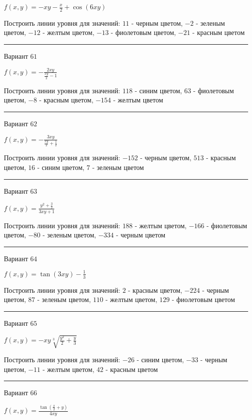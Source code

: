 \documentclass[11pt]{report}
\begin{document}
$f(x, y) = - x y - \frac{x}{2} + \cos{\left(6 x y \right)}$

Построить линии уровня для значений: $11$ - черным цветом, $-2$ - зеленым цветом, $-12$ - желтым цветом, $-13$ - фиолетовым цветом, $-21$ - красным цветом
\begin{center}
\noindent\rule{8cm}{0.4pt}
\end{center}
Вариант $61$


$f(x, y) = - \frac{2 x y}{\frac{x y}{2} - 1}$

Построить линии уровня для значений: $118$ - синим цветом, $63$ - фиолетовым цветом, $-8$ - красным цветом, $-154$ - желтым цветом
\begin{center}
\noindent\rule{8cm}{0.4pt}
\end{center}
Вариант $62$


$f(x, y) = - \frac{3 x y}{\frac{x y}{2} + \frac{1}{2}}$

Построить линии уровня для значений: $-152$ - черным цветом, $513$ - красным цветом, $16$ - синим цветом, $7$ - зеленым цветом
\begin{center}
\noindent\rule{8cm}{0.4pt}
\end{center}
Вариант $63$


$f(x, y) = \frac{y^{2} + \frac{3}{2}}{3 x y + 1}$

Построить линии уровня для значений: $188$ - желтым цветом, $-166$ - фиолетовым цветом, $-80$ - зеленым цветом, $-334$ - черным цветом
\begin{center}
\noindent\rule{8cm}{0.4pt}
\end{center}
Вариант $64$


$f(x, y) = \tan{\left(3 x y \right)} - \frac{1}{3}$

Построить линии уровня для значений: $2$ - красным цветом, $-224$ - черным цветом, $87$ - зеленым цветом, $110$ - желтым цветом, $129$ - фиолетовым цветом
\begin{center}
\noindent\rule{8cm}{0.4pt}
\end{center}
Вариант $65$


$f(x, y) = - x y \sqrt[3]{\frac{y^{2}}{2} + \frac{y}{3}}$

Построить линии уровня для значений: $-26$ - синим цветом, $-33$ - черным цветом, $-11$ - желтым цветом, $42$ - красным цветом
\begin{center}
\noindent\rule{8cm}{0.4pt}
\end{center}
Вариант $66$


$f(x, y) = \frac{\tan{\left(\frac{x}{2} + y \right)}}{4 x y}$
\end{document}
